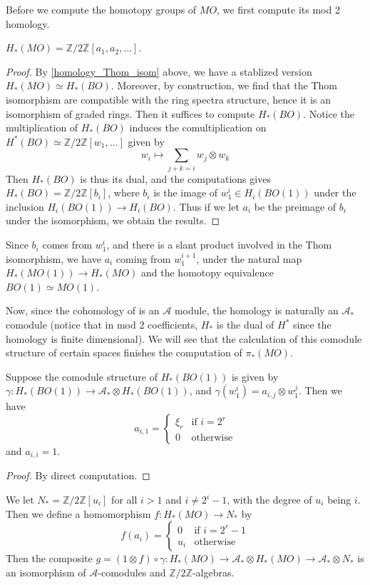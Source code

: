 	Before we compute the homotopy groups of $MO$, we first compute its mod 2 homology. 
	\begin{thm}
		$H_*(MO)=\mathbb{Z}/2\mathbb{Z}[a_1,a_2,\dots]$. 
	\end{thm}
	\begin{proof}
		By \cref{homology_Thom_isom} above, we have a stablized version $H_*(MO)\simeq H_*(BO)$. Moreover, by construction, we find that the Thom isomorphism are compatible with the ring spectra structure, hence it is an isomorphism of graded rings. Then it suffices to compute $H_*(BO)$. Notice the multiplication of $H_*(BO)$ induces the comultiplication on $H^*(BO)\simeq\mathbb{Z}/2\mathbb{Z}[w_1,\dots]$ given by 
		\[ w_i\mapsto\sum_{j+k=i}w_j\otimes w_k \]
		Then $H_*(BO)$ is thus its dual, and the computations gives $H_*(BO)=\mathbb{Z}/2\mathbb{Z}[b_i]$, where $b_i$ is the image of $w_1^i\in H_i(BO(1))$ under the inclusion $H_i(BO(1))\to H_i(BO)$. Thus if we let $a_i$ be the preimage of $b_i$ under the isomorphism, we obtain the results. 
	\end{proof}
	\begin{remark}
		Since $b_i$ comes from $w_1^i$, and there is a slant product involved in the Thom isomorphism, we have $a_i$ coming from $w_1^{i+1}$, under the natural map $H_*(MO(1))\to H_*(MO)$ and the homotopy equivalence $BO(1)\simeq MO(1)$. 
	\end{remark}
	Now, since the cohomology of is an $\mathcal{A}$ module, the homology is naturally an $\mathcal{A}_*$ comodule (notice that in mod 2 coefficients, $H_*$ is the dual of $H^*$ since the homology is finite dimensional). We will see that the calculation of this comodule structure of certain spaces finishes the computation of $\pi_*(MO)$. 
	\begin{lemma}\label{comod_struct_BO1}
		Suppose the comodule structure of $H_*(BO(1))$ is given by $\gamma:H_*(BO(1))\to\mathcal{A}_*\otimes H_*(BO(1))$, and $\gamma(w_1^i)=a_{i,j}\otimes w_1^j$. Then we have
		\begin{equation*}
		a_{i,1}=
		\begin{cases}
			\xi_r & \text{if~}i=2^r \\
			0     & \text{otherwise}
		\end{cases}
		\end{equation*}
		and $a_{i,i}=1$. 
	\end{lemma}
	\begin{proof}
		By direct computation. 
	\end{proof}
	\begin{thm}
		We let $N_*=\mathbb{Z}/2\mathbb{Z}[u_i]$ for all $i>1$ and $i\neq 2^i-1$, with the degree of $u_i$ being $i$. Then we define a homomorphism $f:H_*(MO)\to N_*$ by 
		\begin{equation*}
		f(a_i)=
		\begin{cases}
			0   & \text{if~} i=2^r-1 \\
			u_i & \text{otherwise}
		\end{cases}
		\end{equation*}
		Then the composite $g=(1\otimes f)\circ\gamma:H_*(MO)\to \mathcal{A}_*\otimes H_*(MO)\to\mathcal{A}_*\otimes N_*$ is an isomorphism of $\mathcal{A}$-comodules and $\mathbb{Z}/2\mathbb{Z}$-algebras. 
	\end{thm}
